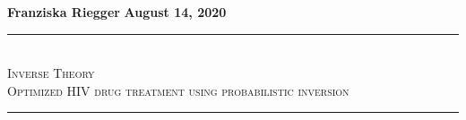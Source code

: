 \noindent
\textbf{Franziska Riegger} \hfill \textbf{August 14, 2020}\\[0.1cm]
\newcommand{\HRule}{\rule{\linewidth}{0.5mm}} %

 \begin{center}



\HRule \\[0.4cm]
\textsc{\Huge Inverse Theory}\\[0.25cm]
\textsc{\Large Optimized HIV drug treatment using probabilistic inversion}
\\[0.2cm] %
\HRule \\[1.0cm]
 





\end{center}
